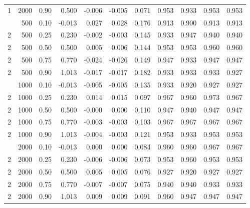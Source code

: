 \begin{table}[t]
\begin{tabular}{rrr r rr r rrrr}
1 & 2000 & 0.90 & 0.500 & -0.006 & -0.005 & 0.071 & 0.953 & 0.933 & 0.953 & 0.953 \\
\addlinespace
2 & 500 & 0.10 & -0.013 & 0.027 & 0.028 & 0.176 & 0.913 & 0.900 & 0.913 & 0.913 \\
2 & 500 & 0.25 & 0.230 & -0.002 & -0.003 & 0.145 & 0.933 & 0.947 & 0.940 & 0.940 \\
2 & 500 & 0.50 & 0.500 & 0.005 & 0.006 & 0.144 & 0.953 & 0.953 & 0.960 & 0.960 \\
2 & 500 & 0.75 & 0.770 & -0.024 & -0.026 & 0.149 & 0.947 & 0.933 & 0.947 & 0.947 \\
2 & 500 & 0.90 & 1.013 & -0.017 & -0.017 & 0.182 & 0.933 & 0.933 & 0.933 & 0.927 \\
\addlinespace
2 & 1000 & 0.10 & -0.013 & -0.005 & -0.005 & 0.135 & 0.933 & 0.920 & 0.927 & 0.927 \\
2 & 1000 & 0.25 & 0.230 & 0.014 & 0.015 & 0.097 & 0.967 & 0.960 & 0.973 & 0.967 \\
2 & 1000 & 0.50 & 0.500 & -0.000 & 0.000 & 0.110 & 0.947 & 0.940 & 0.947 & 0.947 \\
2 & 1000 & 0.75 & 0.770 & -0.003 & -0.003 & 0.103 & 0.967 & 0.967 & 0.967 & 0.967 \\
2 & 1000 & 0.90 & 1.013 & -0.004 & -0.003 & 0.121 & 0.953 & 0.933 & 0.953 & 0.953 \\
\addlinespace
2 & 2000 & 0.10 & -0.013 & 0.000 & 0.000 & 0.084 & 0.960 & 0.960 & 0.967 & 0.967 \\
2 & 2000 & 0.25 & 0.230 & -0.006 & -0.006 & 0.073 & 0.953 & 0.960 & 0.953 & 0.953 \\
2 & 2000 & 0.50 & 0.500 & 0.005 & 0.005 & 0.076 & 0.927 & 0.920 & 0.927 & 0.927 \\
2 & 2000 & 0.75 & 0.770 & -0.007 & -0.007 & 0.075 & 0.940 & 0.940 & 0.933 & 0.933 \\
2 & 2000 & 0.90 & 1.013 & 0.009 & 0.009 & 0.091 & 0.960 & 0.947 & 0.947 & 0.947 \\
\bottomrule
\end{tabular}
\end{table}
